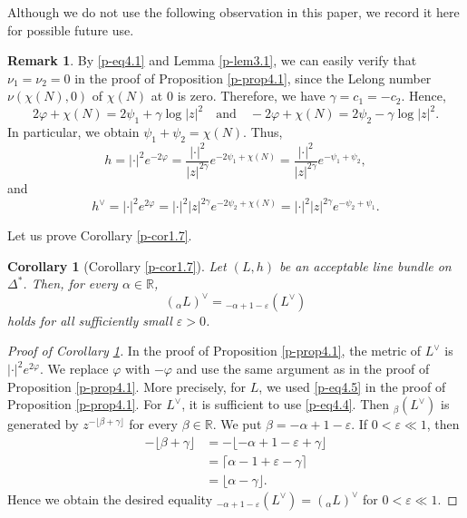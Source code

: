 \documentclass[12pt,twoside]{amsart}
\newtheorem{cor}[thm]{Corollary}
\theoremstyle{definition}
\newtheorem{rem}[thm]{Remark}
\begin{document}
Although we do not use the following observation in this paper, 
we record it here for possible future use.

\begin{rem}\label{p-rem4.2}
By \eqref{p-eq4.1} and Lemma \ref{p-lem3.1}, 
we can easily verify that $\nu_1 = \nu_2 = 0$ in the 
proof of Proposition \ref{p-prop4.1}, since 
the Lelong number $\nu(\chi (N), 0)$ of $\chi (N)$ at $0$ is zero. 
Therefore, we have $\gamma = c_1 = -c_2$. 
Hence,
\[
2\varphi + \chi(N) = 2\psi_1 + \gamma \log |z|^2
\quad \text{and} \quad
-2\varphi + \chi(N) = 2\psi_2 - \gamma \log |z|^2.
\]
In particular, we obtain $\psi_1 + \psi_2 = \chi(N)$. 
Thus,
\[
h = |\cdot|^2 e^{-2\varphi}
= \frac{|\cdot|^2}{|z|^{2\gamma}} e^{-2\psi_1 + \chi(N)}
= \frac{|\cdot|^2}{|z|^{2\gamma}} e^{-\psi_1 + \psi_2},
\]
and
\[
h^\vee = |\cdot|^2 e^{2\varphi}
= |\cdot|^2 |z|^{2\gamma} e^{-2\psi_2 + \chi(N)}
= |\cdot|^2 |z|^{2\gamma} e^{-\psi_2 + \psi_1}.
\]
\end{rem}

Let us prove Corollary \ref{p-cor1.7}. 

\begin{cor}[Corollary \ref{p-cor1.7}]\label{p-cor4.3}
Let $(L, h)$ be an acceptable line bundle on $\Delta^*$. 
Then, for every $\alpha \in \mathbb R$, 
\[
\left({}_\alpha L\right)^\vee ={}_{-\alpha +1-\varepsilon}\left(L^\vee \right)
\] 
holds for all sufficiently small $\varepsilon>0$. 
\end{cor}

\begin{proof}[Proof of Corollary \ref{p-cor4.3}] 
In the proof of Proposition \ref{p-prop4.1}, 
the metric of $L^\vee$ is $|\cdot|^2e^{2\varphi}$. 
We replace $\varphi$ with $-\varphi$ and use the same 
argument as in the proof of Proposition \ref{p-prop4.1}. 
More precisely, for $L$, we used \eqref{p-eq4.5} in the proof of 
Proposition \ref{p-prop4.1}. For $L^\vee$, it is 
sufficient to use \eqref{p-eq4.4}. 
Then ${}_\beta\left(L^\vee\right)$ is generated by 
$z^{-\lfloor \beta+\gamma\rfloor}$ for every $\beta\in \mathbb R$. 
We put $\beta=-\alpha +1-\varepsilon$. 
If $0<\varepsilon \ll 1$, then 
\[
\begin{split}
-\lfloor \beta+\gamma\rfloor 
&=-\lfloor -\alpha+1-\varepsilon +\gamma\rfloor \\ 
& =\lceil \alpha -1+\varepsilon -\gamma\rceil \\ 
& =\lfloor \alpha-\gamma\rfloor. 
\end{split} 
\] 
Hence we obtain the desired equality ${}_{-\alpha +1-\varepsilon} \left(L^\vee\right) 
=\left({}_{\alpha} L\right)^{\vee}$ for $0<\varepsilon \ll 1$. 
\end{proof}
\end{document}
